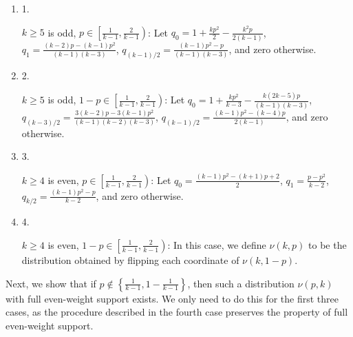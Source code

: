 \documentclass[10pt,a4paper]{article}
\begin{document}
\begin{enumerate}


\item[] 
1. 


$k\geqslant 5$ is odd, $p\in\left[\frac{1}{k-1},\frac{2}{k-1}\right)$: Let $q_{0}=1+\frac{kp^{2}}{2}-\frac{k^{2}p}{2(k-1)}$, $q_{1}=\frac{(k-2)p-(k-1)p^{2}}{(k-1)(k-3)}$, $q_{(k-1)/2}=\frac{(k-1)p^{2}-p}{(k-1)(k-3)}$, and zero otherwise.\par





\item[] 
2. 


$k\geqslant 5$ is odd, $1-p\in\left[\frac{1}{k-1},\frac{2}{k-1}\right)$: Let $q_{0}=1+\frac{kp^{2}}{k-3}-\frac{k(2k-5)p}{(k-1)(k-3)}$, $q_{(k-3)/2}=\frac{3(k-2)p-3(k-1)p^{2}}{(k-1)(k-2)(k-3)}$, $q_{(k-1)/2}=\frac{(k-1)p^{2}-(k-4)p}{2(k-1)}$, and zero otherwise.\par





\item[] 
3. 


$k\geqslant 4$ is even, $p\in\left[\frac{1}{k-1},\frac{2}{k-1}\right)$: Let $q_{0}=\frac{(k-1)p^{2}-(k+1)p+2}{2}$, $q_{1}=\frac{p-p^{2}}{k-2}$, $q_{k/2}=\frac{(k-1)p^{2}-p}{k-2}$, and zero otherwise.\par





\item[] 
4. 


$k\geqslant 4$ is even, $1-p\in\left[\frac{1}{k-1},\frac{2}{k-1}\right)$: In this case, we define $\nu(k,p)$ to be the distribution obtained by flipping each coordinate of $\nu(k,1-p)$.\par





\end{enumerate}




Next, we show that if $p\not\in\left\{\frac{1}{k-1},1-\frac{1}{k-1}\right\}$, then such a distribution $\nu(p,k)$ with full even-weight support exists.
We only need to do this for the first three cases, as the procedure described in the fourth case preserves the property of full even-weight support.\par
\end{document}
